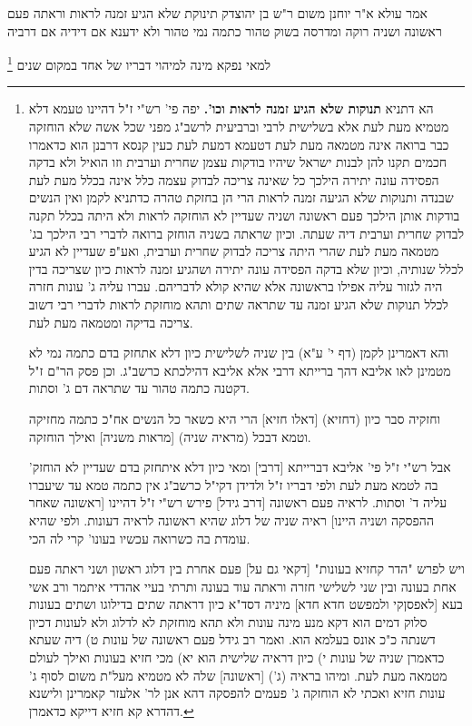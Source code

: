 \documentclass[12pt, openany]{book}
\newcommand{\footnotecomment}[1]{
	\renewcommand\thefootnote{}
	\footnote{#1}}
\newcommand{\commenta}[1]{\footnotecomment{#1}}
\begin{document}
{אמר עולא א"ר יוחנן משום ר"ש בן יהוצדק תינוקת שלא הגיע זמנה לראות וראתה פעם ראשונה ושניה רוקה ומדרסה בשוק טהור כתמה נמי טהור ולא ידענא אם דידיה אם דרביה 
\commenta{ הא דתניא \textbf{תנוקות שלא הגיע זמנה לראות וכו'.} יפה פי' רש"י ז"ל דהיינו טעמא דלא מטמיא מעת לעת אלא בשלישית לרבי וברביעית לרשב"ג מפני שכל אשה שלא הוחזקה כבר ברואה אינה מטמאה מעת לעת דטעמא דמעת לעת כעין קנסא דרבנן הוא כדאמרו חכמים תקנו להן לבנות ישראל שיהיו בודקות עצמן שחרית וערבית וזו הואיל ולא בדקה הפסידה עונה יתירה הילכך כל שאינה צריכה לבדוק עצמה כלל אינה בכלל מעת לעת שבנדה ותנוקות שלא הגיעה זמנה לראות הרי הן בחזקת טהרה כדתניא לקמן ואין הנשים בודקות אותן הילכך פעם ראשונה ושניה שעדיין לא הוחזקה לראות ולא היתה בכלל תקנה לבדוק שחרית וערבית דיה שעתה. וכיון שראתה בשניה הוחזק ברואה לדברי רבי הילכך בג' מטמאה מעת לעת שהרי היתה צריכה לבדוק שחרית וערבית, ואע"פ שעדיין לא הגיע לכלל שנותיה, וכיון שלא בדקה הפסידה עונה יתירה ושהגיע זמנה לראות כיון שצריכה בדין היה לגזור עליה אפילו בראשונה אלא שהיא קולא לדבריהם. עברו עליה ג' עונות חזרה לכלל תנוקות שלא הגיע זמנה עד שתראה שתים ותהא מוחזקת לראות לדברי רבי דשוב צריכה בדיקה ומטמאה מעת לעת.\par והא דאמרינן לקמן (דף י' ע"א) בין שניה לשלישית כיון דלא אתחזק בדם כתמה נמי לא מטמינן לאו אליבא דהך ברייתא דרבי אלא אליבא דהילכתא כרשב"ג. וכן פסק הר"ם ז"ל דקטנה כתמה טהור עד שתראה דם ג' וסתות.\par וחזקיה סבר כיון (דחזיא) [דאלו חזיא] הרי היא כשאר כל הנשים אח"כ כתמה מחזיקה וטמא דבכל (מראיה שניה) [מראות משניה] ואילך הוחזקה.\par אבל רש"י ז"ל פי' אליבא דברייתא [דרבי] ומאי כיון דלא איתחזק בדם שעדיין לא הוחזק' בה לטמא מעת לעת ולפי דבריו ז"ל ולדידן דקי"ל כרשב"ג אין כתמה טמא עד שיעברו עליה ד' וסתות. לראיה פעם ראשונה [דרב גידל] פירש רש"י ז"ל דהיינו [ראשונה שאחר ההפסקה ושניה היינו] ראיה שניה של דלוג שהיא ראשונה לראיה דעונות. ולפי שהיא עומדת בה כשרואה עכשיו בעונו' קרי לה הכי.\par ויש לפרש "הדר קחזיא בעונות" [דקאי גם על] פעם אחרת בין דלוג ראשון ושני ראתה פעם אחת בעונה ובין שני לשלישי חזרה וראתה עוד בעונה ותרתי בעיי אהדדי איתמר ורב אשי בעא [לאפסןקי ולמפשט חדא חדא] מיניה דסד"א כיון דראתה שתים בדילוגו ושתים בעונות סלוק דמים הוא דקא מנע מינה עונות ולא תהא מוחזקת לא לדלוג ולא לעונות דכיון דשנתה כ"כ אונס בעלמא הוא. ואמר רב גידל פעם ראשונה של עונות ט) דיה שעתא כדאמרן שניה של עונות י) כיון דראיה שלישית הוא יא) מכי חזיא בעונות ואילך לעולם מטמאה מעת לעת. ומיהו בראיה (ג') [ראשונה] שלה לא מטמיא מעל"ת משום לסוף ג' עונות חזיא ואכתי לא הוחזקה ג' פעמים להפסקה דהא אנן לר' אלעזר קאמרינן ולישנא דהדרא קא חזיא דייקא כדאמרן. }
למאי נפקא מינה למיהוי דבריו של אחד במקום שנים 
}
\end{document}
